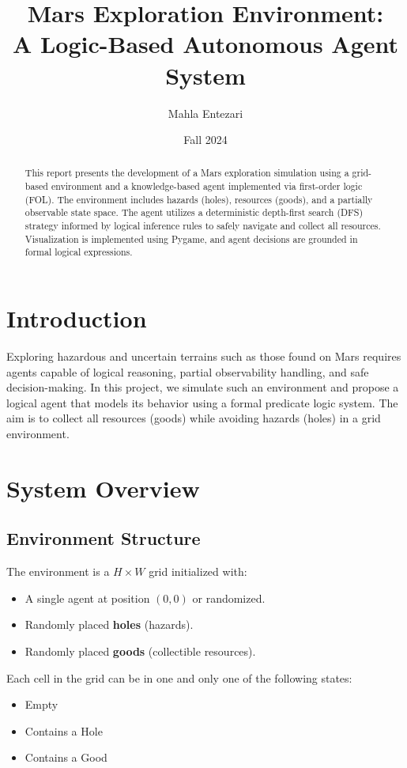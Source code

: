 \documentclass[12pt]{article}
\title{Mars Exploration Environment: \\
A Logic-Based Autonomous Agent System}
\author{Mahla Entezari}
\date{Fall 2024}
\begin{document}
\maketitle

\begin{abstract}
This report presents the development of a Mars exploration simulation using a grid-based environment and a knowledge-based agent implemented via first-order logic (FOL). The environment includes hazards (holes), resources (goods), and a partially observable state space. The agent utilizes a deterministic depth-first search (DFS) strategy informed by logical inference rules to safely navigate and collect all resources. Visualization is implemented using Pygame, and agent decisions are grounded in formal logical expressions.
\end{abstract}

\section{Introduction}

Exploring hazardous and uncertain terrains such as those found on Mars requires agents capable of logical reasoning, partial observability handling, and safe decision-making. In this project, we simulate such an environment and propose a logical agent that models its behavior using a formal predicate logic system. The aim is to collect all resources (goods) while avoiding hazards (holes) in a grid environment.

\section{System Overview}

\subsection{Environment Structure}

The environment is a $H \times W$ grid initialized with:
\begin{itemize}
    \item A single agent at position $(0, 0)$ or randomized.
    \item Randomly placed \textbf{holes} (hazards).
    \item Randomly placed \textbf{goods} (collectible resources).
\end{itemize}

Each cell in the grid can be in one and only one of the following states:
\begin{itemize}
    \item Empty
    \item Contains a Hole
    \item Contains a Good
\end{itemize}
\end{document}
